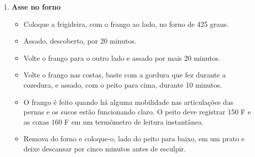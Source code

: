 \documentclass [11pt, letterpaper] {article}
\begin{document}
\begin {description}
\begin {enumerate}
\item {\bf Asse no forno}
\begin {itemize}
\item Coloque a frigideira, com o frango ao lado, no forno de 425 graus.
\item Assado, descoberto, por 20 minutos.
\item Volte o frango para o outro lado e assado por mais 20 minutos.
\item Volte o frango nas costas, baste com a gordura que fez durante a cozedura, e assado, com o peito para cima, durante 10 minutos.
\item O frango é feito quando há alguma mobilidade nas articulações das pernas e os sucos estão funcionando claro. O peito deve registrar 150 F e as coxas 160 F em um termômetro de leitura instantânea.
\item Remova do forno e coloque-o, lado do peito para baixo, em um prato e deixe descansar por cinco minutos antes de esculpir.
\end {itemize}
\end {enumerate}
\end {description}
\end{document}
